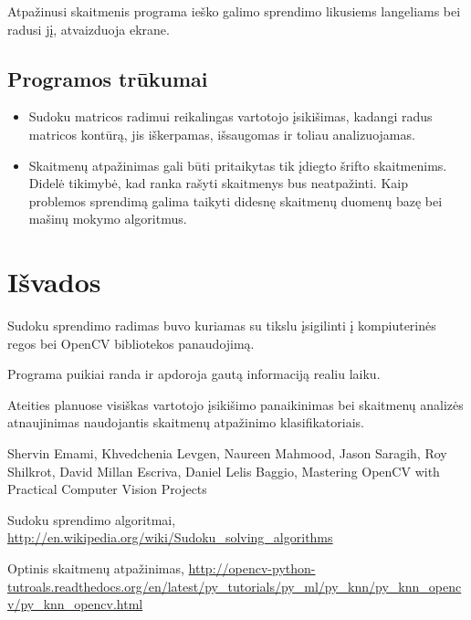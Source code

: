 \documentclass[a4paper,12pt]{article}
\begin{document}
Atpažinusi skaitmenis programa ieško galimo sprendimo likusiems langeliams bei radusi jį, atvaizduoja ekrane.
 
\subsection{Programos trūkumai}
\begin{itemize}
    \item Sudoku matricos radimui reikalingas vartotojo įsikišimas, kadangi radus matricos kontūrą, jis iškerpamas, išsaugomas ir toliau analizuojamas. 
    \item Skaitmenų atpažinimas gali būti pritaikytas tik įdiegto šrifto skaitmenims. Didelė tikimybė, kad ranka rašyti skaitmenys bus neatpažinti. Kaip problemos sprendimą galima taikyti didesnę skaitmenų duomenų bazę bei mašinų mokymo algoritmus.
\end{itemize}
 
\newpage

\section*{Išvados}
Sudoku sprendimo radimas buvo kuriamas su tikslu įsigilinti į kompiuterinės regos bei OpenCV bibliotekos panaudojimą.

Programa puikiai randa ir apdoroja gautą informaciją realiu laiku.

Ateities planuose visiškas vartotojo įsikišimo panaikinimas bei skaitmenų analizės atnaujinimas naudojantis skaitmenų atpažinimo klasifikatoriais.

\newpage
 
\begin{thebibliography}{99}
Shervin Emami, Khvedchenia Levgen, Naureen Mahmood, Jason Saragih, Roy Shilkrot, David Millan Escriva, Daniel Lelis Baggio, Mastering OpenCV with Practical Computer Vision Projects

Sudoku sprendimo algoritmai, \url{http://en.wikipedia.org/wiki/Sudoku_solving_algorithms} 

 
Optinis skaitmenų atpažinimas, \url{http://opencv-python-tutroals.readthedocs.org/en/latest/py_tutorials/py_ml/py_knn/py_knn_opencv/py_knn_opencv.html}

\end{thebibliography} 
\end{document}

